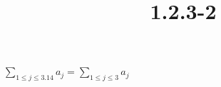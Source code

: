 \documentclass{article}
\title{1.2.3-2}
\begin{document}
\maketitle

\( \sum_{1 \leq j \leq 3.14} a_j = \sum_{1 \leq j \leq 3} a_j \)
\end{document}
